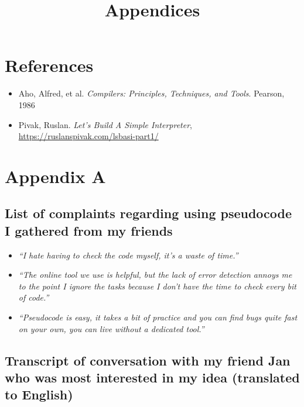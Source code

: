 \documentclass{article}
\title{Appendices}
\date{}
\begin{document}
    
\maketitle

\section{References}
    
    \begin{itemize}
        \item Aho, Alfred, et al. \textit{Compilers: Principles, Techniques, and
            Tools}. Pearson, 1986
        \item Pivak, Ruslan. \textit{Let's Build A Simple Interpreter}, 
            \url{https://ruslanspivak.com/lsbasi-part1/}
    \end{itemize}

\section{Appendix A}

\subsection{List of complaints regarding using pseudocode I gathered from my friends}

    \begin{itemize}
        \item \textit{``I hate having to check the code myself, it's a waste
            of time.''}
        \item \textit{``The online tool we use is helpful, but the lack of 
            error detection annoys me to the point I ignore the tasks because
            I don't have the time to check every bit of code.''}
        \item \textit{``Pseudocode is easy, it takes a bit of practice and
            you can find bugs quite fast on your own, you can live without
            a dedicated tool.''}
    \end{itemize}


\subsection{Transcript of conversation with my friend Jan who was most interested 
        in my idea (translated to English)}
\end{document}
